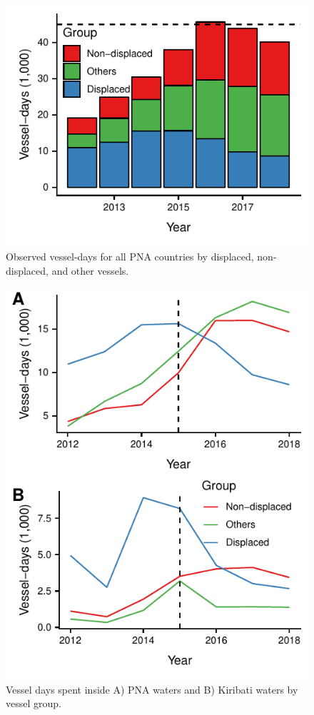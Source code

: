 \documentclass[9p,twocolumn,twoside,lineno]{pnas-new}
\begin{document}
\begin{figure}[ht]
\centering
	\includegraphics{img/all_PS_VDS_year.pdf}
	\caption{\label{fig:all_PS_VDS_year}Observed vessel-days for all PNA countries by displaced, non-displaced, and other vessels.}
\end{figure}

\begin{figure}[ht]
\centering
	\includegraphics{img/included_PS_VDS_year_DiD.pdf}
	\caption{\label{fig:included_PS_VDS_year_DiD}Vessel days spent inside A) PNA waters and B) Kiribati waters by vessel group.}
\end{figure}
\end{document}
